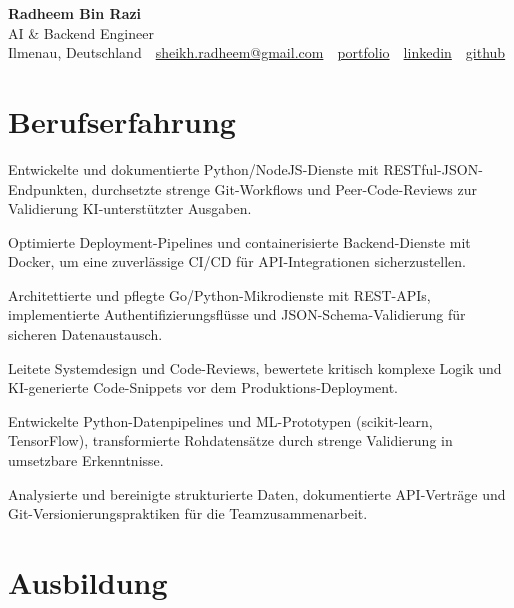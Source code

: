 \documentclass[11pt,a4paper]{resume}
\makeatletter
\newcommand{\Portfolio}{https://radheem.github.io/my-cv}
\newcommand{\PortfolioText}{portfolio}
\newcommand{\GitHub}{https://github.com/radheem}
\newcommand{\LinkedIn}{https://www.linkedin.com/in/radheem-razi}
\newcommand{\Email}{sheikh.radheem@gmail.com}
\makeatother
\begin{document}
\clearpage
{}

\begin{center}
  {\huge\bfseries Radheem Bin Razi}\\[3pt]
  {\large AI \& Backend Engineer}\\[6pt]
  \small
  Ilmenau, Deutschland \,\textbar\,
  \href{mailto:\Email}{\Email} \,\textbar\,
  \href{\Portfolio}{\PortfolioText} \,\textbar\,
  \href{\LinkedIn}{linkedin} \,\textbar\,
  \href{\GitHub}{github}
\end{center}
\vspace{2pt}

\section{Berufserfahrung}

\bullets
  \item Entwickelte und dokumentierte Python/NodeJS-Dienste mit RESTful-JSON-Endpunkten, durchsetzte strenge Git-Workflows und Peer-Code-Reviews zur Validierung KI-unterstützter Ausgaben.
  \item Optimierte Deployment-Pipelines und containerisierte Backend-Dienste mit Docker, um eine zuverlässige CI/CD für API-Integrationen sicherzustellen.
\bulletsend
\vspace{3pt}
\bullets
  \item Architettierte und pflegte Go/Python-Mikrodienste mit REST-APIs, implementierte Authentifizierungsflüsse und JSON-Schema-Validierung für sicheren Datenaustausch.
  \item Leitete Systemdesign und Code-Reviews, bewertete kritisch komplexe Logik und KI-generierte Code-Snippets vor dem Produktions-Deployment.
\bulletsend
\vspace{3pt}
\bullets
  \item Entwickelte Python-Datenpipelines und ML-Prototypen (scikit-learn, TensorFlow), transformierte Rohdatensätze durch strenge Validierung in umsetzbare Erkenntnisse.
  \item Analysierte und bereinigte strukturierte Daten, dokumentierte API-Verträge und Git-Versionierungspraktiken für die Teamzusammenarbeit.
\bulletsend
\vspace{3pt}

\section{Ausbildung}
\end{document}

